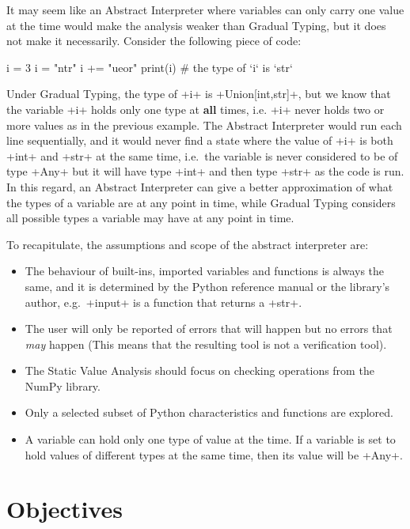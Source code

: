 It may seem like an Abstract Interpreter where variables can only carry one value at the
time would make the analysis weaker than Gradual Typing, but it does not make it necessarily.
Consider the following piece of code:

\begin{pythoncode}
i = 3
i = "ntr"
i += "ueor"
print(i)  # the type of `i` is `str`
\end{pythoncode}

Under Gradual Typing, the type of \pycode+i+ is \pycode+Union[int,str]+, but we know that
the variable \pycode+i+ holds only one type at \textbf{all} times, i.e. \pycode+i+ never
holds two or more values as in the previous example. The Abstract Interpreter would run
each line sequentially, and it would never find a state where the value of \pycode+i+ is
both \pycode+int+ and \pycode+str+ at the same time, i.e.~the variable is never considered
to be of type \pycode+Any+ but it will have type \pycode+int+ and then type \pycode+str+
as the code is run. In this regard, an Abstract Interpreter can give a better
approximation of what the types of a variable are at any point in time, while Gradual
Typing considers all possible types a variable may have at any point in time.

To recapitulate, the assumptions and scope of the abstract interpreter are:

\begin{itemize}
\tightlist
\item The behaviour of built-ins, imported variables and functions is always the same,
  and it is determined by the Python reference manual or the library's author,
  e.g.~\pycode+input+ is a function that returns a \pycode+str+.
\item The user will only be reported of errors that will happen but no errors that
  \emph{may} happen (This means that the resulting tool is not a verification tool).
\item The Static Value Analysis should focus on checking operations from the NumPy library.
\item Only a selected subset of Python characteristics and functions are explored.
\item A variable can hold only one type of value at the time. If a variable is set to hold
  values of different types at the same time, then its value will be \pycode+Any+.
\end{itemize}

\section{Objectives}\label{objectives}

